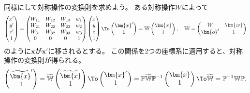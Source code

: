 \documentclass[11pt]{easymemo}
\begin{document}
同様にして対称操作の変換則を求めよう。
ある対称操作$\mathcal{W}$によって
\begin{align}
  \begin{pmatrix} x' \\ y' \\ z' \\ 1 \end{pmatrix}
  =
  \begin{pmatrix}
    W_{11} & W_{12} & W_{13} & w_{1} \\
    W_{21} & W_{22} & W_{23} & w_{2} \\
    W_{31} & W_{32} & W_{33} & w_{3} \\
    0      & 0      & 0      & 1     \\
  \end{pmatrix}
  \begin{pmatrix} x \\ y \\ z \\ 1 \end{pmatrix}
  \To
  \begin{pmatrix} \bm{x}' \\ 1 \end{pmatrix}
  =\mathbb{W}
  \begin{pmatrix} \bm{x} \\ 1 \end{pmatrix},
  \quad
  \mathbb{W}
  =\begin{pmatrix} W & \bm{w} \\ \bm{o}^{t} & 1 \end{pmatrix}
\end{align}
のように$\bm{x}$が$\bm{x}'$に移されるとする。
この関係を2つの座標系に適用すると、対称操作の変換則が得られる。
\begin{align}
  \begin{pmatrix} \widetilde{\bm{x}}' \\ 1 \end{pmatrix}
  =\widetilde{\mathbb{W}}
  \begin{pmatrix} \widetilde{\bm{x}} \\ 1 \end{pmatrix}
  \To
  \begin{pmatrix} \bm{x}' \\ 1 \end{pmatrix}
  =\mathbb{P}\widetilde{\mathbb{W}}
  \mathbb{P}^{-1}\begin{pmatrix} \bm{x} \\ 1 \end{pmatrix}
  \To
  \widetilde{\mathbb{W}}=\mathbb{P}^{-1}\mathbb{W}\mathbb{P}.
\end{align}
\end{document}
